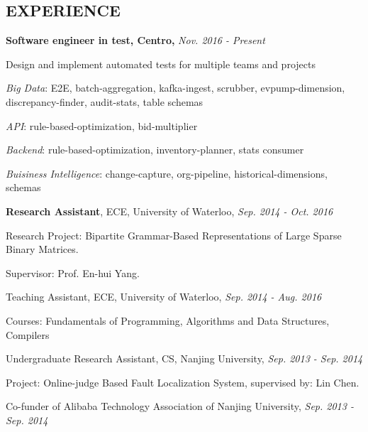\documentclass{res}
\newcommand{\parsp}{\vspace{-0.7\baselineskip}}
\newcommand{\additemindent}{\addtolength{\itemindent}{1em}}
\begin{document}
\begin{resume}
\parsp
\section{EXPERIENCE}
\begin{asparaitem}
	\item \textbf{Software engineer in test, Centro,} \hfill \emph{Nov. 2016 - Present}
		\begin{asparaitem}
			\additemindent
			\item Design and implement automated tests for multiple teams and projects
			\begin{asparaitem}
				\additemindent
				\item \emph{Big Data}: E2E, batch-aggregation, kafka-ingest, scrubber, evpump-dimension, discrepancy-finder, audit-stats, table schemas
				\item \emph{API}: rule-based-optimization, bid-multiplier
				\item \emph{Backend}: rule-based-optimization, inventory-planner, stats consumer 
				\item \emph{Buisiness Intelligence}: change-capture, org-pipeline, historical-dimensions, schemas
			\end{asparaitem}
		\end{asparaitem}

	\item \textbf{Research Assistant}, ECE, University of Waterloo, \hfill \emph{Sep. 2014 - Oct. 2016}
		\begin{asparaitem}
			\additemindent
			\item Research Project: Bipartite Grammar-Based Representations of Large Sparse Binary Matrices.
			\item Supervisor: Prof. En-hui Yang. 
		\end{asparaitem}

	\item Teaching Assistant, ECE, University of Waterloo, \hfill \emph{Sep. 2014 - Aug. 2016}
		\begin{asparaitem}
			\additemindent
			\item Courses: Fundamentals of Programming, Algorithms and Data Structures, Compilers
		\end{asparaitem}

	\item Undergraduate Research Assistant, CS, Nanjing University, \hfill \emph{Sep. 2013 - Sep. 2014}
		\begin{asparaitem}
			\additemindent
			\item Project: Online-judge Based Fault Localization System, supervised by: Lin Chen.
		\end{asparaitem}
	\item Co-funder of Alibaba Technology Association of Nanjing University, \hfill \emph{Sep. 2013 - Sep. 2014}
\end{asparaitem}


\end{resume}
\end{document}
